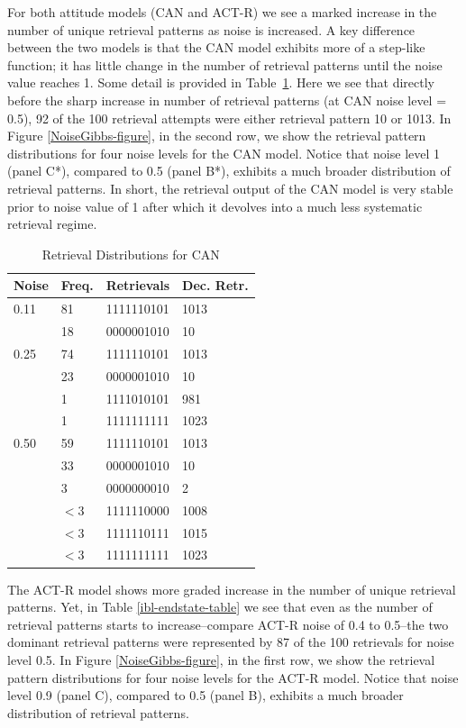 \documentclass[10pt,letterpaper]{article}
\begin{document}
For both attitude models (CAN and ACT-R) we see a marked increase in the number of unique retrieval patterns as noise is increased.  A key difference between the two models is that the CAN model exhibits more of a step-like function; it has little change in the number of retrieval patterns until the noise value reaches 1.  Some detail is provided in Table~\ref{can-endstate-table}.  Here we see that directly before the sharp increase in number of retrieval patterns (at CAN noise level = 0.5), 92 of the 100 retrieval attempts were either retrieval pattern 10 or 1013.  In Figure \ref{NoiseGibbs-figure}, in the second row, we show the retrieval pattern distributions for four noise levels for the CAN model. Notice that noise level 1 (panel C*), compared to 0.5 (panel B*), exhibits a much broader distribution of retrieval patterns.  In short, the retrieval output of the CAN model is very stable prior to noise value of 1 after which it devolves into a much less systematic retrieval regime.     

\begin{table}[H]
\begin{center} 
\caption{Retrieval Distributions for CAN} 
\label{can-endstate-table} 
\vskip 0.12in
\begin{tabular}{llll} 
\hline
Noise  & Freq.  &  Retrievals & Dec. Retr.\\
\hline
0.11    & 81  &    1111110101 & 1013 \\
& 18    & 0000001010 & 10 \\
\hline
0.25    & 74  &    1111110101 & 1013 \\
& 23    & 0000001010 & 10 \\
     & 1 & 1111010101 & 981 \\
     & 1 & 1111111111 & 1023\\
\hline
0.50    & 59  &    1111110101 & 1013 \\
& 33    & 0000001010 & 10 \\
             & 3 & 0000000010 & 2 \\
        & $<3$ & 1111110000 & 1008\\
        & $<3$ & 1111110111 & 1015\\
        & $<3$ & 1111111111 & 1023\\
\hline
\end{tabular} 
\end{center} 
\end{table}

The ACT-R model shows more graded increase in the number of unique retrieval patterns. Yet, in Table \ref{ibl-endstate-table} we see that even as the number of retrieval patterns starts to increase--compare ACT-R noise of 0.4 to 0.5--the two dominant retrieval patterns were represented by 87 of the 100 retrievals for noise level 0.5.  In Figure \ref{NoiseGibbs-figure}, in the first row, we show the retrieval pattern distributions for four noise levels for the ACT-R model. Notice that noise level 0.9 (panel C), compared to 0.5 (panel B), exhibits a much broader distribution of retrieval patterns. 
\end{document}
